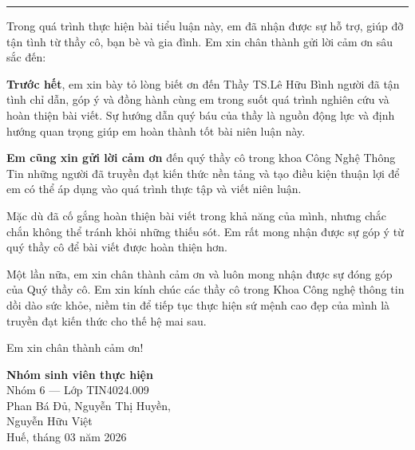 \documentclass[13pt,a4paper]{article}
\begin{document}
\newpage
\thispagestyle{empty}
\vspace*{0.35\baselineskip}
{\normalsize
    \tableofcontents
}
\newpage
\thispagestyle{empty}
\vspace*{0.4cm}
\begin{center}
    \fontsize{19}{24}\selectfont\bfseries{}\par
    \vspace{0.25ex}
    \rule{0.30\textwidth}{1.8pt}
\end{center}
\vspace{0.85cm}

{}

\parindent=1.1cm
\setlength{\parskip}{0.6ex plus 0.2ex}
Trong quá trình thực hiện bài tiểu luận này, em đã nhận được sự hỗ trợ, giúp đỡ tận tình từ thầy cô, bạn bè và gia đình. Em xin chân thành gửi lời cảm ơn sâu sắc đến:

\textbf{Trước hết}, em xin bày tỏ lòng biết ơn đến Thầy TS.Lê Hữu Bình người đã tận tình chỉ dẫn, góp ý và đồng hành cùng em trong suốt quá trình nghiên cứu và hoàn thiện bài viết. Sự hướng dẫn quý báu của thầy là nguồn động lực và định hướng quan trọng giúp em hoàn thành tốt bài niên luận này.

\textbf{Em cũng xin gửi lời cảm ơn} đến quý thầy cô trong khoa Công Nghệ Thông Tin những người đã truyền đạt kiến thức nền tảng và tạo điều kiện thuận lợi để em có thể áp dụng vào quá trình thực tập và viết niên luận.

Mặc dù đã cố gắng hoàn thiện bài viết trong khả năng của mình, nhưng chắc chắn không thể tránh khỏi những thiếu sót. Em rất mong nhận được sự góp ý từ quý thầy cô để bài viết được hoàn thiện hơn.

Một lần nữa, em xin chân thành cảm ơn và luôn mong nhận được sự đóng góp của Quý thầy cô. Em xin kính chúc các thầy cô trong Khoa Công nghệ thông tin dồi dào sức khỏe, niềm tin để tiếp tục thực hiện sứ mệnh cao đẹp của mình là truyền đạt kiến thức cho thế hệ mai sau.

Em xin chân thành cảm ơn!

\parindent=0pt
\parskip=0pt
\vspace{0.8cm}
\hfill\begin{minipage}[t]{7cm}
    \fontsize{13}{16}\selectfont
    \begin{flushright}
        \textbf{Nhóm sinh viên thực hiện}\\
        Nhóm 6 --- Lớp TIN4024.009\\
        Phan Bá Đủ, Nguyễn Thị Huyền,\\
        Nguyễn Hữu Việt\\[0.5em]
        Huế, tháng 03 năm 2026
    \end{flushright}
\end{minipage}
\end{document}
